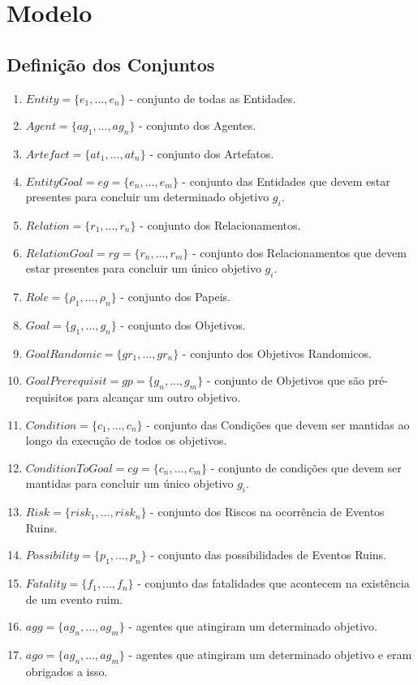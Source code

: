 \documentclass[12pt]{article}
\begin{document}
\section{Modelo}

\subsection{Definição dos Conjuntos}

\begin{enumerate}
	\item $Entity = \{e_1, ..., e_n\}$ - conjunto de todas as Entidades.  
	\item $Agent = \{ag_1, ..., ag_n\}$ - conjunto dos Agentes.
	\item $Artefact = \{at_1, ..., at_n\}$ - conjunto dos Artefatos.
	\item $EntityGoal = eg = \{e_n,...,e_m\}$ - conjunto das Entidades que devem estar presentes para concluir um determinado objetivo $g_i$.
	\item $Relation = \{r_1, ..., r_n\}$ - conjunto dos Relacionamentos.	
	\item $RelationGoal = rg =\{r_n, ..., r_m\}$ - conjunto dos Relacionamentos que devem estar presentes para concluir um único objetivo $g_i$.		
	\item $Role = \{\rho_1, ..., \rho_n\}$ - conjunto dos Papeis.	
	\item $Goal = \{g_1, ..., g_n\}$ - conjunto dos Objetivos.
	\item $GoalRandomic = \{gr_1,..., gr_n\}$ - conjunto dos Objetivos	Randomicos.
	\item $GoalPrerequisit = gp = \{g_n,...,g_m\}$ - conjunto de Objetivos que são pré-requisitos para alcançar um outro objetivo.
	\item $Condition = \{c_1, ..., c_n\}$ - conjunto das Condições que devem ser mantidas ao longo da execução de todos os objetivos.
	\item $ConditionToGoal = cg = \{c_n, ..., c_m\}$ - conjunto de condições que devem ser mantidas para concluir um único objetivo $g_i$.
	\item $Risk = \{risk_1, ..., risk_n\}$ - conjunto dos Riscos na ocorrência de Eventos Ruins.
	\item $Possibility = \{p_1, ..., p_n\}$ - conjunto das possibilidades de Eventos Ruins. 
	\item $Fatality = \{f_1, ..., f_n\}$ - conjunto das fatalidades que acontecem na existência de um evento ruim. 	
	\item $agg = \{ag_n,...,ag_m\}$ - agentes que atingiram um determinado objetivo. 
	\item $ago = \{ag_n,...,ag_m\}$ - agentes que atingiram um determinado objetivo e eram obrigados a isso. 
\end{enumerate}
\end{document}
